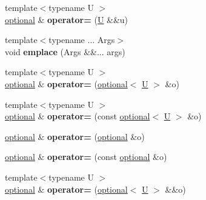 \begin{DoxyCompactItemize}
{\footnotesize template$<$typename U $>$ }\\\mbox{\hyperlink{classfc_1_1optional}{optional}} \& {\bfseries operator=} (\mbox{\hyperlink{union_u}{U}} \&\&u)
\item 
\mbox{\label{classfc_1_1optional_a557098078523cf30dd8778fa0face74a}} 
{\footnotesize template$<$typename ... Args$>$ }\\void {\bfseries emplace} (Args \&\&... args)
\item 
\mbox{\label{classfc_1_1optional_abf0e68e8f400e4490a329ce596f0a079}} 
{\footnotesize template$<$typename U $>$ }\\\mbox{\hyperlink{classfc_1_1optional}{optional}} \& {\bfseries operator=} (\mbox{\hyperlink{classfc_1_1optional}{optional}}$<$ \mbox{\hyperlink{union_u}{U}} $>$ \&o)
\item 
\mbox{\label{classfc_1_1optional_a13c16803022e66a2cef36aeeace4a3ee}} 
{\footnotesize template$<$typename U $>$ }\\\mbox{\hyperlink{classfc_1_1optional}{optional}} \& {\bfseries operator=} (const \mbox{\hyperlink{classfc_1_1optional}{optional}}$<$ \mbox{\hyperlink{union_u}{U}} $>$ \&o)
\item 
\mbox{\label{classfc_1_1optional_a85304d4e96b6dedc3a125abc96120631}} 
\mbox{\hyperlink{classfc_1_1optional}{optional}} \& {\bfseries operator=} (\mbox{\hyperlink{classfc_1_1optional}{optional}} \&o)
\item 
\mbox{\label{classfc_1_1optional_a859ec2e84e277ecca8a1353978b0df5b}} 
\mbox{\hyperlink{classfc_1_1optional}{optional}} \& {\bfseries operator=} (const \mbox{\hyperlink{classfc_1_1optional}{optional}} \&o)
\item 
\mbox{\label{classfc_1_1optional_a15bcd4eed1211821573f8a7cc6af1b97}} 
{\footnotesize template$<$typename U $>$ }\\\mbox{\hyperlink{classfc_1_1optional}{optional}} \& {\bfseries operator=} (\mbox{\hyperlink{classfc_1_1optional}{optional}}$<$ \mbox{\hyperlink{union_u}{U}} $>$ \&\&o)
\item 
\mbox{\label{classfc_1_1optional_a9aa346eec49d2f8538667b1fbd8f70e5}} 

\end{DoxyCompactItemize}
